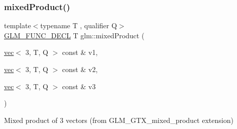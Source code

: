 \subsubsection{\texorpdfstring{mixed\+Product()}{mixedProduct()}}
{\footnotesize\ttfamily template$<$typename T , qualifier Q$>$ \\
\hyperlink{setup_8hpp_ab2d052de21a70539923e9bcbf6e83a51}{G\+L\+M\+\_\+\+F\+U\+N\+C\+\_\+\+D\+E\+CL} T glm\+::mixed\+Product (\begin{DoxyParamCaption}\item[{\hyperlink{structglm_1_1vec}{vec}$<$ 3, T, Q $>$ const \&}]{v1,  }\item[{\hyperlink{structglm_1_1vec}{vec}$<$ 3, T, Q $>$ const \&}]{v2,  }\item[{\hyperlink{structglm_1_1vec}{vec}$<$ 3, T, Q $>$ const \&}]{v3 }\end{DoxyParamCaption})}



Mixed product of 3 vectors (from G\+L\+M\+\_\+\+G\+T\+X\+\_\+mixed\+\_\+product extension) 

